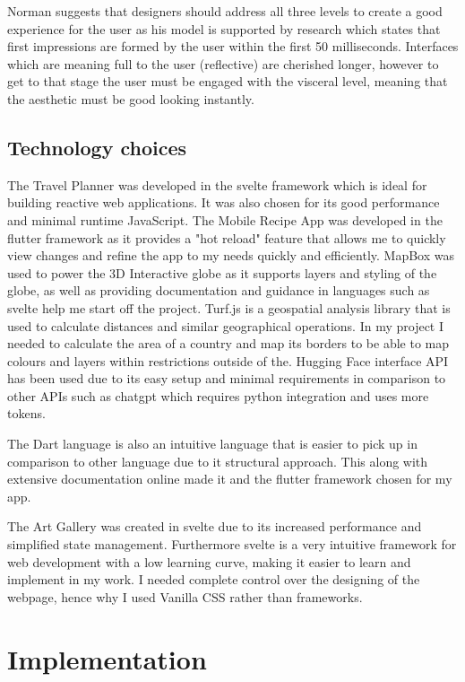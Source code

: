 \documentclass[]{project_final}
\begin{document}
Norman suggests that designers should address all three levels to create a good experience for the user as his model is supported by research which states that first impressions are formed by the user within the first 50 milliseconds. Interfaces which are meaning full to the user (reflective) are cherished longer, however to get to that stage the user must be engaged with the visceral level, meaning that the aesthetic must be good looking instantly.\cite{noauthor_3_nodate}


\section{Technology choices}
The Travel Planner was developed in the svelte framework which is ideal for building reactive web applications. It was also chosen for its good performance and minimal runtime JavaScript.
The Mobile Recipe App was developed in the flutter framework as it provides a "hot reload" feature that allows me to quickly view changes and refine the app to my needs quickly and efficiently.
MapBox was used to power the 3D Interactive globe as it supports layers  and styling of the globe, as well as providing documentation and guidance in languages such as svelte help me start off the project.
Turf.js is a geospatial analysis library that is used to calculate distances and similar geographical operations. In my project I needed to calculate the area of a country and map its borders to be able to map colours and layers within restrictions outside of the.
Hugging Face interface API has been used due to its easy setup and minimal requirements in comparison to other APIs such as chatgpt which requires python integration and uses more tokens.

The Dart language is also an intuitive language that is easier to pick up in comparison to other language due to it structural approach. This along with extensive documentation online made it and the flutter framework chosen for my app.

The Art Gallery was created in svelte due to its increased performance and simplified state management. Furthermore svelte is a very intuitive framework for web development with a low learning curve, making it easier to learn and implement in my work. I needed complete control over the designing of the webpage, hence why I used Vanilla CSS rather than frameworks.

\chapter{Implementation}
\end{document}
